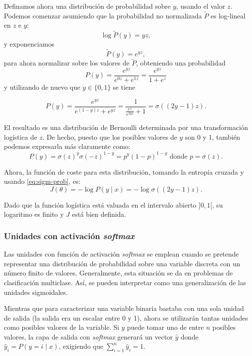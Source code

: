 Definamos ahora una distribución de probabilidad sobre \(y\), usando el
valor \(z\). Podemos comenzar asumiendo que la probabilidad no
normalizada \(\tilde P\) es log-lineal en \(z\) e \(y\):
\[\log \tilde P(y)=yz,\] y exponenciamos \[\tilde P(y)=e^{yz},\] para
ahora normalizar sobre los valores de \(\tilde P\), obteniendo una
probabilidad \[P(y)=\frac{e^{yz}}{e^{0z}+e^{1z}}=\frac{e^{yz}}{1+e^z}\]
y utilizando de nuevo que \(y\in\{0,1\}\) se tiene

\begin{equation}\label{eq:sigm-prob}
  P(y)=\frac{e^{yz}}{e^{(1-y)z}+e^{yz}}=\frac{1}{\frac{e^{z}}{e^{2yz}}+1}=\sigma((2y-1)z).
\end{equation}

El resultado es una distribución de Bernoulli determinada por una
transformación logística de \(z\). De hecho, puesto que los posibles
valores de \(y\) son 0 y 1, también podemos expresarla más claramente
como:
\[P(y)=\sigma(z)^y\sigma(-z)^{1-y}=p^y(1-p)^{1-y}\mbox{ donde }p=\sigma(z).\]

Ahora, la función de coste para esta distribución, tomando la entropía
cruzada y usando \eqref{eq:sigm-prob}, es:
\[J(\theta)=-\log P(y\mid x)=-\log\sigma((2y-1)z).\]

Dado que la función logística está valuada en el intervalo abierto
\(]0,1[\), su logaritmo es finito y \(J\) está bien definida.

\subsubsection{\texorpdfstring{Unidades con activación
\emph{softmax}}{Unidades con activación softmax}}\label{unidades-con-activaciuxf3n-softmax}

Las unidades con función de activación \emph{softmax} se emplean cuando
se pretende representar una distribución de probabilidad sobre una
variable discreta con un número finito de valores. Generalmente, esta
situación se da en problemas de clasificación multiclase. Así, se pueden
interpretar como una generalización de las unidades sigmoidales.

Mientras que para caracterizar una variable binaria bastaba con una sola
unidad de salida (la salida era un escalar entre 0 y 1), ahora se
utilizarán tantas unidades como posibles valores de la variable. Si
\(y\) puede tomar uno de entre \(n\) posibles valores, la capa de salida
con \emph{softmax} generará un vector \(\hat y\) donde
\(\hat y_i=P(y=i\mid x)\), exigiendo que \(\sum_{i=1}^n\hat y_i=1\).

